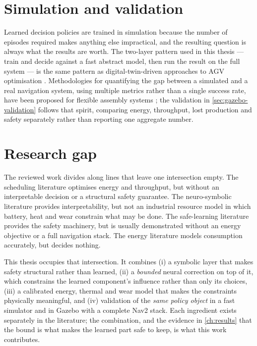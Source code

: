 \section{Simulation and validation}
\label{sec:sim2real}

Learned decision policies are trained in simulation because the number of episodes required makes
anything else impractical, and the resulting question is always what the results are worth. The
two-layer pattern used in this thesis --- train and decide against a fast abstract model, then run
the result on the full system --- is the same pattern as digital-twin-driven approaches to AGV
optimisation \cite{lee2025digitaltwinagv}. Methodologies for quantifying the gap between a
simulated and a real navigation system, using multiple metrics rather than a single success rate,
have been proposed for flexible assembly systems \cite{bergs2025digitaltwinnavigation}; the
validation in \cref{sec:gazebo-validation} follows that spirit, comparing energy, throughput, lost
production and safety separately rather than reporting one aggregate number.

\section{Research gap}
\label{sec:gap}

The reviewed work divides along lines that leave one intersection empty. The scheduling literature
\cite{dilefeld2025batterymanagement, cheng2025energysavingfjsp, chang2025hierarchicalagv,
zhou2025resilientcharging, lee2025digitaltwinagv, warita2024onlineplanning} optimises energy and
throughput, but without an interpretable decision or a structural safety guarantee. The
neuro-symbolic literature \cite{baugh2025neuraldnfmt, hu2024graphworldmodels, kozik2025explainable}
provides interpretability, but not an industrial resource model in which battery, heat and wear
constrain what may be done. The safe-learning literature \cite{koenighofer2025shields,
odriozola2025fearfield, long2025humanriskaware} provides the safety machinery, but is usually
demonstrated without an energy objective or a full navigation stack. The energy literature
\cite{gora2024energyprediction, rico2025explainableenergy, mohamadi2024payloadpower} models
consumption accurately, but decides nothing.

This thesis occupies that intersection. It combines (i) a symbolic layer that makes safety
structural rather than learned, (ii) a \emph{bounded} neural correction on top of it, which
constrains the learned component's influence rather than only its choices, (iii) a calibrated
energy, thermal and wear model that makes the constraints physically meaningful, and (iv)
validation of the \emph{same policy object} in a fast simulator and in Gazebo with a complete Nav2
stack. Each ingredient exists separately in the literature; the combination, and the evidence in
\cref{ch:results} that the bound is what makes the learned part safe to keep, is what this work
contributes.
